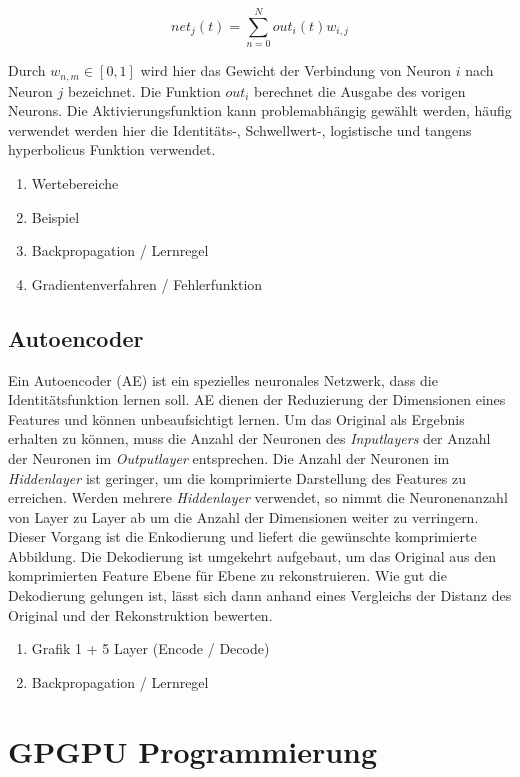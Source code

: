 $$net_{j}(t) = \sum_{n=0}^N out_{i}(t)w_{i, j}$$

Durch $w_{n, m} \in [0, 1] $ wird hier das Gewicht der Verbindung von Neuron $i$ nach Neuron $j$ bezeichnet. Die Funktion $out_{i}$ berechnet die Ausgabe des vorigen Neurons. Die Aktivierungsfunktion kann problemabhängig gewählt werden, häufig verwendet werden hier die Identitäts-, Schwellwert-, logistische und tangens hyperbolicus Funktion verwendet. 

\begin{enumerate}
	\item Wertebereiche
	\item Beispiel
	\item Backpropagation / Lernregel
	\item Gradientenverfahren / Fehlerfunktion
\end{enumerate}

\cite{zs1997}

\subsection{Autoencoder}

Ein Autoencoder (AE) ist ein spezielles neuronales Netzwerk, dass die Identitätsfunktion lernen soll. AE dienen der Reduzierung der Dimensionen eines Features und können unbeaufsichtigt lernen. Um das Original als Ergebnis erhalten zu können, muss die Anzahl der Neuronen des \textit{Inputlayers} der Anzahl der Neuronen im \textit{Outputlayer} entsprechen. Die Anzahl der Neuronen im \textit{Hiddenlayer} ist geringer, um die komprimierte Darstellung des Features zu erreichen. Werden mehrere \textit{Hiddenlayer} verwendet, so nimmt die Neuronenanzahl von Layer zu Layer ab um die Anzahl der Dimensionen weiter zu verringern. Dieser Vorgang ist die Enkodierung und liefert die gewünschte komprimierte Abbildung. Die Dekodierung ist umgekehrt aufgebaut, um das Original aus den komprimierten Feature Ebene für Ebene zu rekonstruieren. Wie gut die Dekodierung gelungen ist, lässt sich dann anhand eines Vergleichs der Distanz des Original und der Rekonstruktion bewerten.

\begin{enumerate}
	\item Grafik 1 + 5 Layer (Encode / Decode)
	\item Backpropagation / Lernregel
\end{enumerate}

\section{GPGPU Programmierung}

